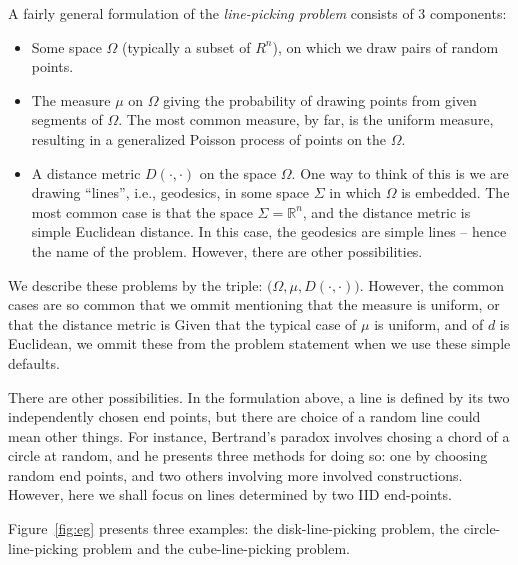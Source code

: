 \documentclass{article}
\def\R{\mathbb{R}}
\begin{document}
A fairly general formulation of the {\em line-picking problem}
consists of 3 components:
\begin{itemize}

\item Some space $\Omega$ (typically a subset of $R^n$), on which we
  draw pairs of random points.

\item The measure $\mu$ on $\Omega$ giving the probability of drawing
  points from given segments of $\Omega$. The most common measure, by
  far, is the uniform measure, resulting in a generalized Poisson
  process of points on the $\Omega$.

\item A distance metric $D(\cdot, \cdot)$ on the space $\Omega$. One
  way to think of this is we are drawing ``lines'', i.e., geodesics,
  in some space $\Sigma$ in which $\Omega$ is embedded. The most
  common case is that the space $\Sigma = \R^n$, and the distance
  metric is simple Euclidean distance. In this case, the geodesics are
  simple lines -- hence the name of the problem. However, there are
  other possibilities.

\end{itemize}
We describe these problems by the triple: $\big(\Omega, \mu, D(\cdot,
\cdot)\big)$. However, the common cases are so common that we ommit
mentioning that the measure is uniform, or that the distance metric is
Given that the typical case of $\mu$ is uniform, and of $d$ is
Euclidean, we ommit these from the problem statement when we use these
simple defaults.

There are other possibilities. In the formulation above, a line is
defined by its two independently chosen end points, but there are
choice of a random line could mean other things. For instance,
Bertrand's paradox involves chosing a chord of a circle at random, and
he presents three methods for doing so: one by choosing random end
points, and two others involving more involved constructions. 
However, here we shall focus on lines determined by two IID
end-points. 

Figure~\ref{fig:eg} presents three examples: the disk-line-picking
problem, the circle-line-picking problem and the cube-line-picking
problem.
\end{document}

